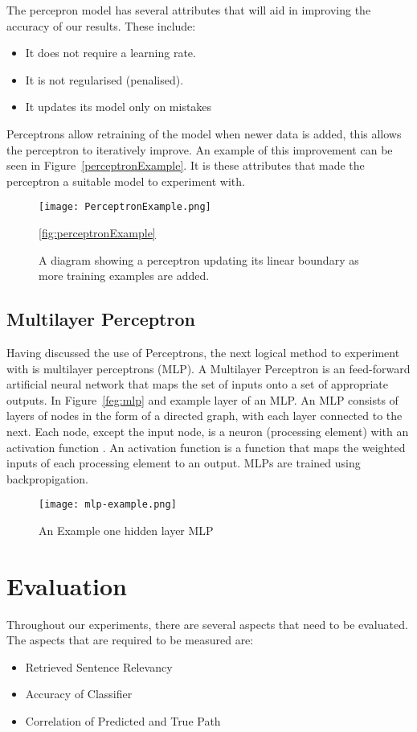\documentclass[bsc,frontabs,twoside,singlespacing,parskip,deptreport]{infthesis}     %
\begin{document}
The percepron model has several attributes that will aid in improving the accuracy of our results.
These include:
\begin{itemize}
\item It does not require a learning rate.
\item It is not regularised (penalised).
\item It updates its model only on mistakes
\end{itemize}

Perceptrons allow retraining of the model when newer data is added, this allows the perceptron to
iteratively improve. An example of this improvement can be seen in Figure~\ref{perceptronExample}.
It is these attributes that made the perceptron a suitable model to experiment with.
\begin{figure}[ht]
  \centering
  \texttt{[image: PerceptronExample.png]}
  \caption{A diagram showing a perceptron updating its linear boundary as more training examples are added. }
  \ref{fig:perceptronExample}
\end{figure}

\subsection{Multilayer Perceptron}
Having discussed the use of Perceptrons, the next logical method to experiment with is multilayer perceptrons (MLP).
A Multilayer Perceptron is an feed-forward artificial neural network that maps the set of inputs
onto a set of appropriate outputs.
In Figure~\ref{feg:mlp} and example layer of an MLP.
An MLP consists of layers of  nodes in the form of a directed graph, with each layer connected to the next.
Each node, except the input node, is a neuron (processing element) with an activation function \cite{}.%
An activation function is a function that maps the weighted inputs of each processing element to an output.
MLPs are trained using backpropigation.

\begin{figure}
  \centering
  \texttt{[image: mlp-example.png]}
  \caption{An Example one hidden layer MLP \cite{scikit-learn}}
  \label{fig:mlp}
\end{figure}

\section{Evaluation}
Throughout our experiments, there are several aspects that need to be evaluated.
The aspects that are required to be measured are:
\begin{itemize}
  \item Retrieved Sentence Relevancy
  \item Accuracy of Classifier
  \item Correlation of Predicted and True Path
\end{itemize}
\end{document}

